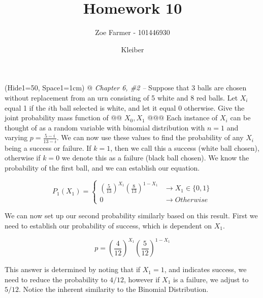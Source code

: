 \documentclass[11pt]{article}\usepackage[]{graphicx}\usepackage[]{xcolor}
\title{Homework 10}
\date{Kleiber}
\author{Zoe Farmer - 101446930}
\begin{document}
\maketitle

\begin{table}[!ht]
    \centering
\end{table}

\begin{easylist}[enumerate]
    \ListProperties(Hide1=50, Space1=1cm)
    @ \textit{Chapter 6, \#2 --} Suppose that 3 balls are chosen without replacement from an urn consisting of 5 white
    and 8 red balls. Let $X_i$ equal 1 if the $i$th ball selected is white, and let it equal 0 otherwise. Give the joint
    probability mass function of
    @@ $X_0, X_1$
    @@@ Each instance of $X_i$ can be thought of as a random variable with binomial distribution with $n=1$ and varying
    $p = \frac{5 - i}{13 - i}$. We can now use these values to find the probability of any $X_i$ being a success or
    failure. If $k=1$, then we call this a success (white ball chosen), otherwise if $k=0$ we denote this as a failure
    (black ball chosen). We know the probability of the first ball, and we can establish our equation.

    \[
        P_1(X_1) =
        \begin{cases}
            { \left( \frac{5}{13} \right)}^{X_1} { \left( \frac{8}{13} \right) }^{1 - X_1} &\to X_1 \in \{ 0, 1 \}\\
            0 &\to Otherwise
        \end{cases}
    \]

    We can now set up our second probability similarly based on this result. First we need to establish our probability
    of success, which is dependent on $X_1$.

    \[
        p = { \left( \frac{4}{12} \right) }^{X_1} { \left( \frac{5}{12} \right) }^{1 - X_1}
    \]

    This answer is determined by noting that if $X_1 = 1$, and indicates success, we need to reduce the probability to
    $4/12$, however if $X_1$ is a failure, we adjust to $5/12$. Notice the inherent similarity to the Binomial
    Distribution.\newline


\end{easylist}
\end{document}
